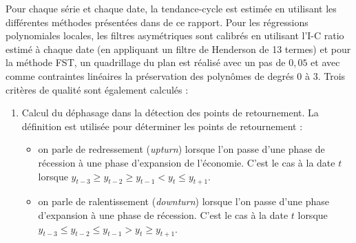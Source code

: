 \documentclass[
  12pt,
  a4paper,french]{article}
\providecommand{\tightlist}{%
  \setlength{\itemsep}{0pt}\setlength{\parskip}{0pt}}
\newcommand\1{\mathds{1}}
\begin{document}
Pour chaque série et chaque date, la tendance-cycle est estimée en utilisant les différentes méthodes présentées dans de ce rapport.
Pour les régressions polynomiales locales, les filtres asymétriques sont calibrés en utilisant l'I-C ratio estimé à chaque date (en appliquant un filtre de Henderson de 13 termes) et pour la méthode FST, un quadrillage du plan est réalisé avec un pas de \(0,05\) et avec comme contraintes linéaires la préservation des polynômes de degrés 0 à 3.
Trois critères de qualité sont également calculés :

\begin{enumerate}
\def\labelenumi{\arabic{enumi}.}
\item
  Calcul du déphasage dans la détection des points de retournement. La définition \textcite{Zellner1991} est utilisée pour déterminer les points de retournement :

  \begin{itemize}
  \tightlist
  \item
    on parle de redressement (\emph{upturn}) lorsque l'on passe d'une phase de récession à une phase d'expansion de l'économie.
    C'est le cas à la date \(t\) lorsque \(y_{t-3}\geq y_{t-2}\geq y_{t-1}<y_t\leq y_{t+1}\).\\
  \item
    on parle de ralentissement (\emph{downturn}) lorsque l'on passe d'une phase d'expansion à une phase de récession.
    C'est le cas à la date \(t\) lorsque \(y_{t-3}\leq y_{t-2}\leq y_{t-1}>y_t\geq y_{t+1}\).
  \end{itemize}


\end{enumerate}
\end{document}
